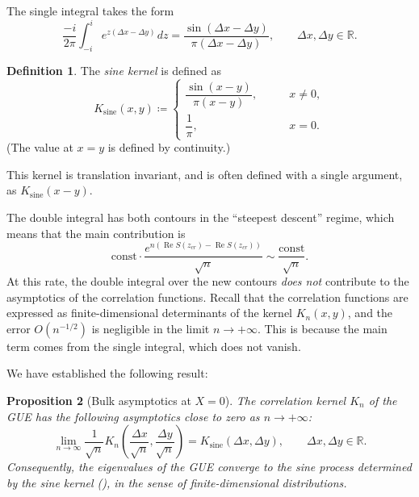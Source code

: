 \documentclass[letterpaper,11pt,oneside,reqno]{book}
\numberwithin{equation}{chapter}  %
\newcommand{\ssp}{\hspace{1pt}}
\newtheorem{proposition}{Proposition}[chapter]  %
\theoremstyle{definition}
\newtheorem{definition}[proposition]{Definition}
\begin{document}
The single integral takes the form
\begin{equation}
	\label{lecture7:eq:K_n_bulk_single}
	\frac{-i}{2\pi}
	\int_{-i}^i
	e^{z (\Delta x -\Delta y)}
	\ssp
	dz
	=\frac{\sin\left( \Delta x-\Delta y \right)}{\pi(\Delta x-\Delta y)},
	\qquad \Delta x,\Delta y\in\mathbb{R}.
\end{equation}
\begin{definition}
	\label{lecture7:def:sine-kernel}
	The \emph{sine kernel} is defined as
	\begin{equation*}
		K_{\mathrm{sine}}(x,y)\coloneqq
		\begin{cases}
			\dfrac{\sin (x-y)}{\pi (x-y)},&\qquad x\ne 0,\\[10pt]
			\dfrac{1}{\pi},&\qquad x=0.
		\end{cases}
	\end{equation*}
	(The value at $x=y$ is defined by continuity.)

	This kernel is translation invariant, and is often
	defined with a single argument, as
	$K_{\mathrm{sine}}(x-y)$.
\end{definition}

The double integral has both contours
in the ``steepest descent'' regime, which means that
the main contribution is
\begin{equation*}
	\mathrm{const}\cdot
	\frac{e^{n\left( \operatorname{Re}S(z_{cr})-\operatorname{Re}S(z_{cr}) \right)}}{\sqrt n}
	\sim \frac{\mathrm{const}}{\sqrt n}.
\end{equation*}
At this rate, the double integral over the new contours
\emph{does not} contribute to the asymptotics of the correlation functions.
Recall that the correlation functions are expressed as finite-dimensional
determinants of the kernel $K_n(x,y)$, and the error $O(n^{-1/2})$ is
negligible in the limit $n\to+\infty$.
This is because the main term comes from the single integral,
which does not vanish.

We have established the following result:
\begin{proposition}[Bulk asymptotics at $X=0$]
	\label{lecture7:prop:bulk}
	The correlation kernel $K_n$ of the GUE has the following asymptotics
	close to zero as $n\to+\infty$:
	\begin{equation*}
		\lim_{n\to \infty}
		\frac{1}{\sqrt n}
		K_n\left( \frac{\Delta x}{\sqrt n},\frac{\Delta y}{\sqrt n} \right)
		=
		K_{\mathrm{sine}}\left( \Delta x,\Delta y \right),
		\qquad \Delta x,\Delta y\in\mathbb{R}.
	\end{equation*}
	Consequently, the eigenvalues of the GUE converge to the sine process
	determined by the sine kernel (),
	in the sense of finite-dimensional distributions.
\end{proposition}
\end{document}
